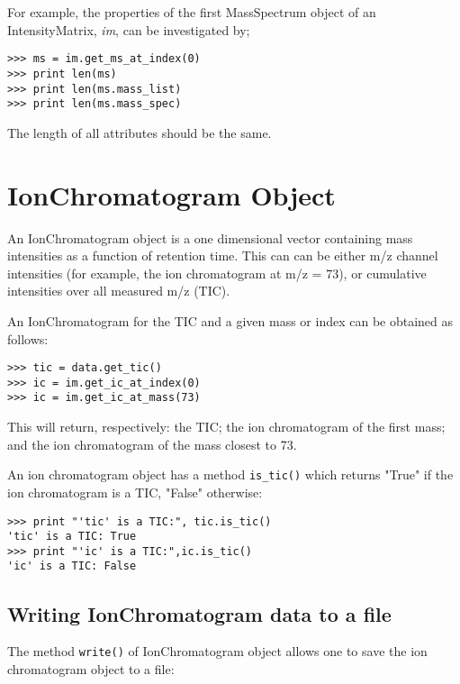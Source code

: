 For example, the properties of the first MassSpectrum object of an
IntensityMatrix, {\em im}, can be investigated by;

\begin{verbatim}
>>> ms = im.get_ms_at_index(0)
>>> print len(ms)
>>> print len(ms.mass_list)
>>> print len(ms.mass_spec)
\end{verbatim}

\noindent
The length of all attributes should be the same.

\section{IonChromatogram Object}
\label{sec:ion-chromatogram-object}

\noindent
An IonChromatogram object is a one dimensional vector containing
mass intensities as a function of retention time. This can can be either
m/z channel intensities (for example, the ion chromatogram at m/z = 73),
or cumulative intensities over all measured m/z (TIC).

An IonChromatogram for the TIC and a given mass or index can be obtained
as follows:

\begin{verbatim}
>>> tic = data.get_tic()
>>> ic = im.get_ic_at_index(0)
>>> ic = im.get_ic_at_mass(73)
\end{verbatim}

\noindent
This will return, respectively: the TIC; the ion chromatogram of the first
mass; and the ion chromatogram of the mass closest to 73.

An ion chromatogram object has a method {\tt is\_tic()} which returns "True"
if the ion chromatogram is a TIC, "False" otherwise:

\begin{verbatim}
>>> print "'tic' is a TIC:", tic.is_tic()
'tic' is a TIC: True
>>> print "'ic' is a TIC:",ic.is_tic()
'ic' is a TIC: False
\end{verbatim}

\subsection{Writing IonChromatogram data to a file}


The method {\tt write()} of IonChromatogram object allows one to save
the ion chromatogram object to a file:

